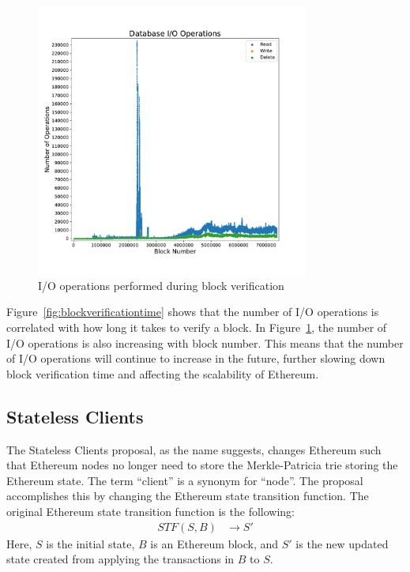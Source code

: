 \documentclass[12pt]{article}
\newcommand{\System}{Stateless Clients\xspace}
\newcommand{\figurewidth}{0.8\textwidth}
\begin{document}
\begin{figure}[H]
  \centering
  \includegraphics[width=\figurewidth]{../figures/results/graphs/background/db-io-ops.pdf}
  \caption{I/O operations performed during block verification}
  \label{fig:blockverification}
\end{figure}

Figure~\ref{fig:blockverificationtime} shows that the number of I/O operations is correlated with how long it takes to verify a block. In Figure~\ref{fig:blockverification}, the number of I/O operations is also increasing with block number. This means that the number of I/O operations will continue to increase in the future, further slowing down block verification time and affecting the scalability of Ethereum.

\subsection{\System}

The \System proposal, as the name suggests, changes Ethereum such that Ethereum nodes no longer need to store the Merkle-Patricia trie storing the Ethereum state. The term ``client'' is a synonym for ``node''. The proposal accomplishes this by changing the Ethereum state transition function. The original Ethereum state transition function is the following:
\begin{align*}
  STF(S, B) &\to S'
\end{align*}
Here, $S$ is the initial state, $B$ is an Ethereum block, and $S'$ is the new updated state created from applying the transactions in $B$ to $S$.
\end{document}
